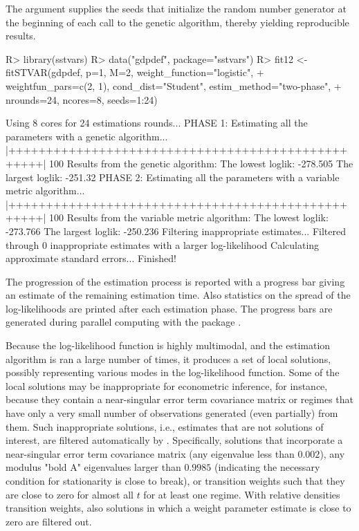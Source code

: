 \documentclass[nojss]{jss}
\begin{document}
The argument  supplies the seeds that initialize the random number generator at the beginning of each call to the genetic algorithm, thereby yielding reproducible results.
%
\begin{CodeChunk}
\begin{CodeInput}
R> library(sstvars)
R> data("gdpdef", package="sstvars")
R> fit12 <- fitSTVAR(gdpdef, p=1, M=2, weight_function="logistic",
+    weightfun_pars=c(2, 1), cond_dist="Student", estim_method="two-phase",
+    nrounds=24, ncores=8, seeds=1:24)
\end{CodeInput}
\begin{CodeOutput}
Using 8 cores for 24 estimations rounds...
PHASE 1: Estimating all the parameters with a genetic algorithm...
  |++++++++++++++++++++++++++++++++++++++++++++++++++| 100%
Results from the genetic algorithm:
The lowest loglik:  -278.505
The largest loglik: -251.32
PHASE 2: Estimating all the parameters with a variable metric algorithm...
  |++++++++++++++++++++++++++++++++++++++++++++++++++| 100%
Results from the variable metric algorithm:
The lowest loglik:  -273.766
The largest loglik: -250.236
Filtering inappropriate estimates...
Filtered through 0 inappropriate  estimates with a larger log-likelihood
Calculating approximate standard errors...
Finished!
\end{CodeOutput}
\end{CodeChunk}
%
The progression of the estimation process is reported with a progress bar giving an estimate of the remaining estimation time. Also statistics on the spread of the log-likelihoods are printed after each estimation phase. The progress bars are generated during parallel computing with the package  \citep{Solymos+Zawadzki:2020}.

Because the log-likelihood function is highly multimodal, and the estimation algorithm is ran a large number of times, it produces a set of local solutions, possibly representing various modes in the log-likelihood function. Some of the local solutions may be inappropriate for econometric inference, for instance, because they contain a near-singular error term covariance matrix or regimes that have only a very small number of observations generated (even partially) from them. Such inappropriate solutions, i.e., estimates that are not solutions of interest, are filtered automatically by . Specifically, solutions that incorporate a near-singular error term covariance matrix (any eigenvalue less than $0.002$), any modulus "bold A" eigenvalues larger than $0.9985$ (indicating the necessary condition for stationarity is close to break), or transition weights such that they are close to zero for almost all $t$ for at least one regime. With relative densities transition weights, also solutions in which a weight parameter estimate is close to zero are filtered out.
\end{document}
